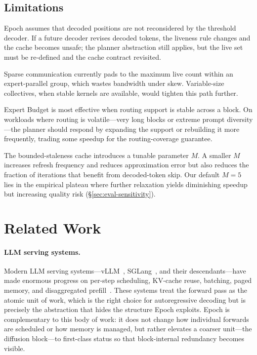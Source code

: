 \documentclass[sigconf,review,anonymous, 10pt]{acmart}
\newcommand{\sys}{Epoch}
\begin{document}
\subsection{Limitations}

\sys{} assumes that decoded positions are not reconsidered by the threshold decoder.
If a future decoder revises decoded tokens, the liveness rule changes and the cache becomes unsafe; the planner abstraction still applies, but the live set must be re-defined and the cache contract revisited.

Sparse communication currently pads to the maximum live count within an expert-parallel group, which wastes bandwidth under skew.
Variable-size collectives, when stable kernels are available, would tighten this path further.

Expert Budget is most effective when routing support is stable across a block.
On workloads where routing is volatile---very long blocks or extreme prompt diversity---the planner should respond by expanding the support or rebuilding it more frequently, trading some speedup for the routing-coverage guarantee.

The bounded-staleness cache introduces a tunable parameter $M$.
A smaller $M$ increases refresh frequency and reduces approximation error but also reduces the fraction of iterations that benefit from decoded-token skip.
Our default $M{=}5$ lies in the empirical plateau where further relaxation yields diminishing speedup but increasing quality risk (\S\ref{sec:eval-sensitivity}).


\section{Related Work}

\paragraph{LLM serving systems.}
Modern LLM serving systems---vLLM~\cite{vllm}, SGLang~\cite{sglang}, and their descendants---have made enormous progress on per-step scheduling, KV-cache reuse, batching, paged memory, and disaggregated prefill~\cite{prefill-service}.
These systems treat the forward pass as the atomic unit of work, which is the right choice for autoregressive decoding but is precisely the abstraction that hides the structure \sys{} exploits.
\sys{} is complementary to this body of work: it does not change how individual forwards are scheduled or how memory is managed, but rather elevates a coarser unit---the diffusion block---to first-class status so that block-internal redundancy becomes visible.
\end{document}
